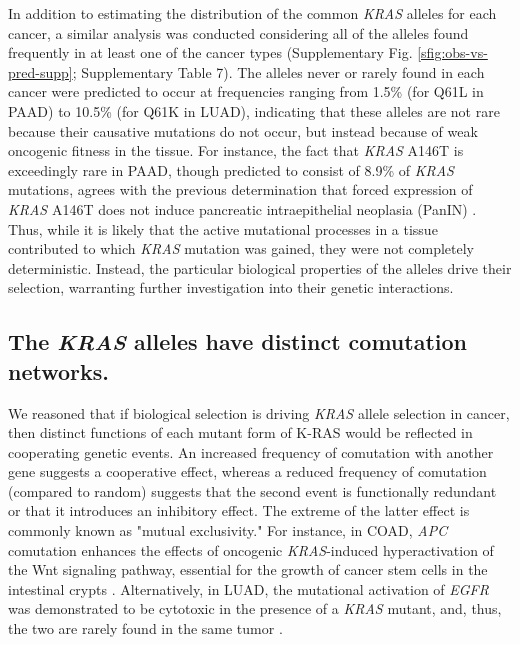 \documentclass[english, 10pt, letterpaper]{article}
\newcommand{\KRAS}{\emph{KRAS}}
\newcommand{\kras}{K-RAS}
\begin{document}
In addition to estimating the distribution of the common \KRAS{} alleles for each cancer, a similar analysis was conducted considering all of the alleles found frequently in at least one of the cancer types (Supplementary Fig. \ref{sfig:obs-vs-pred-supp}; Supplementary Table 7).
The alleles never or rarely found in each cancer were predicted to occur at frequencies ranging from 1.5\% (for Q61L in PAAD) to 10.5\% (for Q61K in LUAD), indicating that these alleles are not rare because their causative mutations do not occur, but instead because of weak oncogenic fitness in the tissue.
For instance, the fact that \KRAS{} A146T is exceedingly rare in PAAD, though predicted to consist of 8.9\% of \KRAS{} mutations, agrees with the previous determination that forced expression of \KRAS{} A146T does not induce pancreatic intraepithelial neoplasia (PanIN) \cite{Poulin2019}.
Thus, while it is likely that the active mutational processes in a tissue contributed to which \KRAS{} mutation was gained, they were not completely deterministic.
Instead, the particular biological properties of the alleles drive their selection, warranting further investigation into their genetic interactions.


\subsection*{The \KRAS{} alleles have distinct comutation networks.}

We reasoned that if biological selection is driving \KRAS{} allele selection in cancer, then distinct functions of each mutant form of \kras{} would be reflected in cooperating genetic events. 
An increased frequency of comutation with another gene suggests a cooperative effect, whereas a reduced frequency of comutation (compared to random) suggests that the second event is functionally redundant or that it introduces an inhibitory effect.
The extreme of the latter effect is commonly known as "mutual exclusivity."
For instance, in COAD, \emph{APC} comutation enhances the effects of oncogenic \KRAS{}-induced hyperactivation of the Wnt signaling pathway, essential for the growth of cancer stem cells in the intestinal crypts \cite{Janssen2006, Fearon2014, Sakai2018, Jauhri2017}.
Alternatively, in LUAD, the mutational activation of \emph{EGFR} was demonstrated to be cytotoxic in the presence of a \KRAS{} mutant, and, thus, the two are rarely found in the same tumor \cite{Unni2015EvidenceAdenocarcinoma., Ambrogio2017InAdenocarcinoma.}.
\end{document}
